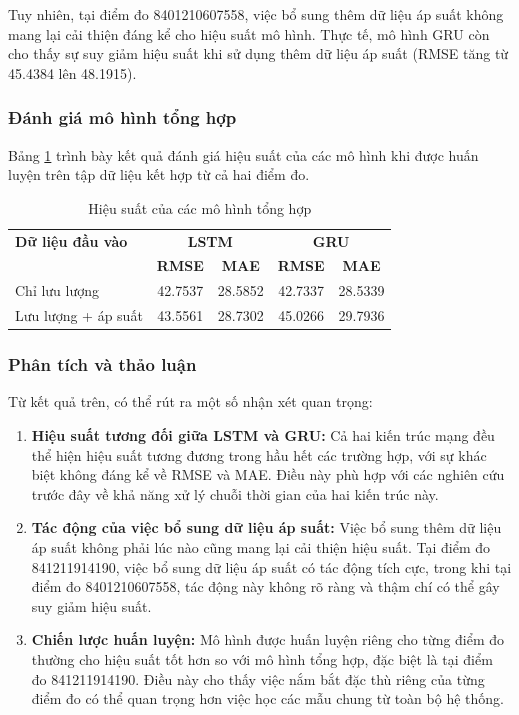 Tuy nhiên, tại điểm đo 8401210607558, việc bổ sung thêm dữ liệu áp suất không mang lại cải thiện đáng kể cho hiệu suất mô hình. Thực tế, mô hình GRU còn cho thấy sự suy giảm hiệu suất khi sử dụng thêm dữ liệu áp suất (RMSE tăng từ 45.4384 lên 48.1915).

\subsubsection{Đánh giá mô hình tổng hợp}

Bảng \ref{tab:combined_model_performance} trình bày kết quả đánh giá hiệu suất của các mô hình khi được huấn luyện trên tập dữ liệu kết hợp từ cả hai điểm đo.

\begin{table}[htbp]
    \centering
    \begin{tabular}{|l|c|c|c|c|}
        \hline
        \textbf{Dữ liệu đầu vào} & \multicolumn{2}{c|}{\textbf{LSTM}} & \multicolumn{2}{c|}{\textbf{GRU}} \\
        \cline{2-5}
        & \textbf{RMSE} & \textbf{MAE} & \textbf{RMSE} & \textbf{MAE} \\
        \hline
        Chỉ lưu lượng & 42.7537 & 28.5852 & 42.7337 & 28.5339 \\
        \hline
        Lưu lượng + áp suất & 43.5561 & 28.7302 & 45.0266 & 29.7936 \\
        \hline
    \end{tabular}
    \caption{Hiệu suất của các mô hình tổng hợp}
    \label{tab:combined_model_performance}
\end{table}

\subsubsection{Phân tích và thảo luận}

Từ kết quả trên, có thể rút ra một số nhận xét quan trọng:

\begin{enumerate}
    \item \textbf{Hiệu suất tương đối giữa LSTM và GRU:} Cả hai kiến trúc mạng đều thể hiện hiệu suất tương đương trong hầu hết các trường hợp, với sự khác biệt không đáng kể về RMSE và MAE. Điều này phù hợp với các nghiên cứu trước đây về khả năng xử lý chuỗi thời gian của hai kiến trúc này.
    
    \item \textbf{Tác động của việc bổ sung dữ liệu áp suất:} Việc bổ sung thêm dữ liệu áp suất không phải lúc nào cũng mang lại cải thiện hiệu suất. Tại điểm đo 841211914190, việc bổ sung dữ liệu áp suất có tác động tích cực, trong khi tại điểm đo 8401210607558, tác động này không rõ ràng và thậm chí có thể gây suy giảm hiệu suất.
    
    \item \textbf{Chiến lược huấn luyện:} Mô hình được huấn luyện riêng cho từng điểm đo thường cho hiệu suất tốt hơn so với mô hình tổng hợp, đặc biệt là tại điểm đo 841211914190. Điều này cho thấy việc nắm bắt đặc thù riêng của từng điểm đo có thể quan trọng hơn việc học các mẫu chung từ toàn bộ hệ thống.
\end{enumerate}

